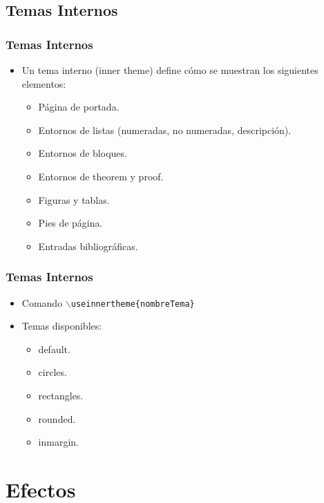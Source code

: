 \documentclass[aspectratio=1610]{beamer}%
\begin{document}
\subsection{Temas Internos}
\begin{frame}[fragile]
\frametitle{\textbf{Temas Internos}}
\justifying
 \begin{itemize}\justifying
  \item Un tema interno (inner theme) define cómo se muestran los siguientes elementos:
  \begin{itemize}\justifying
  \item Página de portada.
  \item Entornos de listas (numeradas, no numeradas, descripción).
  \item Entornos de bloques.
  \item Entornos de theorem y proof.
  \item Figuras y tablas.
  \item Pies de página.
  \item Entradas bibliográficas.
\end{itemize}

\end{itemize}

\end{frame}

\begin{frame}[fragile]
\frametitle{\textbf{Temas Internos}}
\justifying
 \begin{itemize}\justifying
  \item Comando \texttt{$\backslash$useinnertheme\{nombreTema\}}
  \item Temas disponibles:
  \begin{itemize}\justifying
  \item default.
  \item circles.
  \item rectangles.
  \item rounded.
  \item inmargin.
\end{itemize}

\end{itemize}

\end{frame}


\section{Efectos}
\end{document}
